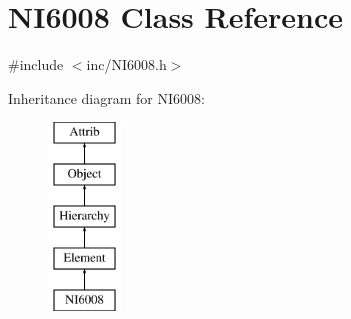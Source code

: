\hypertarget{classNI6008}{}\section{N\+I6008 Class Reference}
\label{classNI6008}


{\ttfamily \#include $<$inc/\+N\+I6008.\+h$>$}

Inheritance diagram for N\+I6008\+:\begin{figure}[H]
\begin{center}
\leavevmode
\includegraphics[height=5.000000cm]{classNI6008}
\end{center}
\end{figure}
